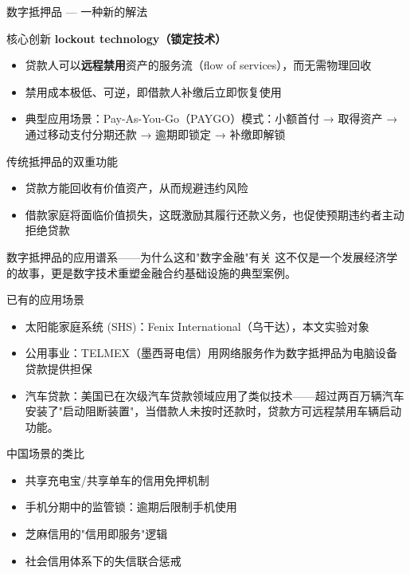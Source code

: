 \begin{frame}{数字抵押品 --- 一种新的解法}
  \begin{block}{核心创新}
  \textbf{lockout technology（锁定技术）}
  

  \begin{itemize}
    \item 贷款人可以\textbf{远程禁用}资产的服务流（flow of services），而无需物理回收
    \item 禁用成本极低、可逆，即借款人补缴后立即恢复使用
    \item 典型应用场景：Pay-As-You-Go（PAYGO）模式：小额首付 → 取得资产 → 通过移动支付分期还款 → 逾期即锁定 → 补缴即解锁
  \end{itemize}

  \end{block}

  \begin{block}{传统抵押品的双重功能}
    \begin{itemize}
        \item 贷款方能回收有价值资产，从而规避违约风险
        \item 借款家庭将面临价值损失，这既激励其履行还款义务，也促使预期违约者主动拒绝贷款
    \end{itemize}
  \end{block}
\end{frame}

\begin{frame}{数字抵押品的应用谱系——为什么这和"数字金融"有关}
  这不仅是一个发展经济学的故事，更是数字技术重塑金融合约基础设施的典型案例。

  \begin{block}{已有的应用场景}
    \begin{itemize}
      \item 太阳能家庭系统 (SHS)：Fenix International（乌干达），本文实验对象
      \item 公用事业：TELMEX（墨西哥电信）用网络服务作为数字抵押品为电脑设备贷款提供担保
      \item 汽车贷款：美国已在次级汽车贷款领域应用了类似技术——超过两百万辆汽车安装了"启动阻断装置"，当借款人未按时还款时，贷款方可远程禁用车辆启动功能。
    \end{itemize}
  \end{block}
  \begin{block}{中国场景的类比}
    \begin{itemize}
      \item 共享充电宝/共享单车的信用免押机制
      \item 手机分期中的监管锁：逾期后限制手机使用
      \item 芝麻信用的"信用即服务"逻辑
      \item 社会信用体系下的失信联合惩戒
    \end{itemize}
  \end{block}
\end{frame}

